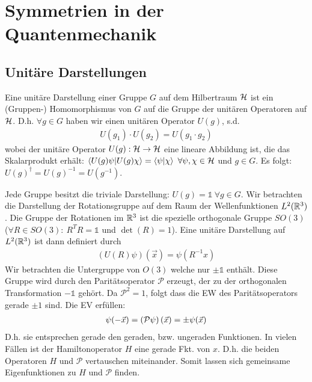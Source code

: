\section{Symmetrien in der Quantenmechanik}

\subsection{Unitäre Darstellungen}

Eine unitäre Darstellung einer Gruppe $G$ auf dem Hilbertraum $\mathcal{H}$ ist ein
(Gruppen-) Homomorphismus von $G$ auf die Gruppe der unitären Operatoren auf $\mathcal{H}$.
D.h. $\forall g \in G$ haben wir einen unitären Operator $U(g)$, s.d.
\begin{align*}
    U(g_1) \cdot U(g_2) = U(g_1 \cdot g_2)
\end{align*}
wobei der unitäre Operator $U(g): \mathcal{H} \rightarrow \mathcal{H}$ eine lineare Abbildung ist,
die das Skalarprodukt erhält: $\left\langle U(g) \psi | U(g) \chi \right\rangle
= \left\langle \psi | \chi \right\rangle \ \forall \psi,\chi \in \mathcal{H}$ und $g \in G$.
Es folgt: $U(g)^\dagger = U(g)^{-1} = U(g^{-1})$.

\vspace{1\baselineskip}

Jede Gruppe besitzt die triviale Darstellung: $U(g) = \mathds{1} \ \forall g \in G$.
Wir betrachten die Darstellung der Rotationsgruppe auf dem Raum der Wellenfunktionen
$L^2(\mathbb{R}^3)$. Die Gruppe der Rotationen im $\mathbb{R}^3$ ist die spezielle orthogonale
Gruppe $SO(3)$ ($\forall R \in SO(3): \ R^T R = \mathds{1}$ und $\det(R) = 1$).
Eine unitäre Darstellung auf $L^2(\mathbb{R}^3)$ ist dann definiert durch
\begin{align*}
    (U(R) \psi)(\vec{x}) = \psi (R^{-1} x)
\end{align*}
Wir betrachten die Untergruppe von $O(3)$ welche nur $\pm \mathds{1}$ enthält.
Diese Gruppe wird durch den Paritätsoperator $\mathcal{P}$ erzeugt, der zu der
orthogonalen Transformation $-\mathds{1}$ gehört. Da $\mathcal{P}^2 = 1$, folgt
dass die EW des Paritätsoperators gerade $\pm 1$ sind. Die EV erfüllen:
\begin{align*}
    \psi(-\vec{x}) = \left( \mathcal{P} \psi \right) (\vec{x}) = \pm \psi(\vec{x})
\end{align*}
D.h. sie entsprechen gerade den geraden, bzw. ungeraden Funktionen. In vielen
Fällen ist der Hamiltonoperator $H$ eine gerade Fkt. von $x$. D.h. die beiden
Operatoren $H$ und $\mathcal{P}$ vertauschen miteinander. Somit lassen sich gemeinsame
Eigenfunktionen zu $H$ und $\mathcal{P}$ finden.

